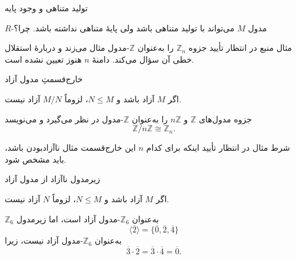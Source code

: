\begin{frame}[t]{تولید متناهی و وجود پایه}
    \label{lec09:finite-generation-versus-basis}
    \begin{remark}
        $R$-مدول $M$ می‌تواند با تولید متناهی باشد ولی پایهٔ متناهی نداشته
        باشد. چرا؟
    \end{remark}
    \begin{alertblock}{مثال منبع در انتظار تأیید }
        جزوه $\mathbb Z_n$ را به‌عنوان $\mathbb Z$-مدول مثال می‌زند و
        دربارهٔ استقلال خطی آن سؤال می‌کند. دامنهٔ $n$ هنوز تعیین نشده است.
    \end{alertblock}
\end{frame}

\begin{frame}[t]{خارج‌قسمتِ مدول آزاد}
    \label{lec09:free-quotient}
    \begin{remark}
        اگر $M$ آزاد باشد و $N\leqslant M$، لزوماً $M/N$ آزاد نیست.
    \end{remark}
    جزوه مدول‌های $\mathbb Z$ و $n\mathbb Z$ را به‌عنوان $\mathbb Z$-مدول
    در نظر می‌گیرد و می‌نویسد
    \[
        \mathbb Z/n\mathbb Z\cong\mathbb Z_n.
    \]
    \begin{alertblock}{شرط مثال در انتظار تأیید }
        اینکه برای کدام $n$ این خارج‌قسمت مثال ناآزادبودن باشد، باید مشخص شود.
    \end{alertblock}
\end{frame}

\begin{frame}[t]{زیرمدول ناآزاد از مدول آزاد}
    \label{lec09:nonfree-submodule-z6}
    \begin{remark}
        اگر $M$ آزاد باشد و $N\leqslant M$، لزوماً $N$ آزاد نیست.
    \end{remark}
    \begin{example}
        $\mathbb Z_6$ به‌عنوان $\mathbb Z_6$-مدول آزاد است، اما زیرمدول
        \[
            \langle\overline2\rangle
            =\{\overline0,\overline2,\overline4\}
        \]
        به‌عنوان $\mathbb Z_6$-مدول آزاد نیست، زیرا
        \[
            \overline3\cdot\overline2
            =\overline3\cdot\overline4
            =\overline0.
        \]
    \end{example}
\end{frame}

